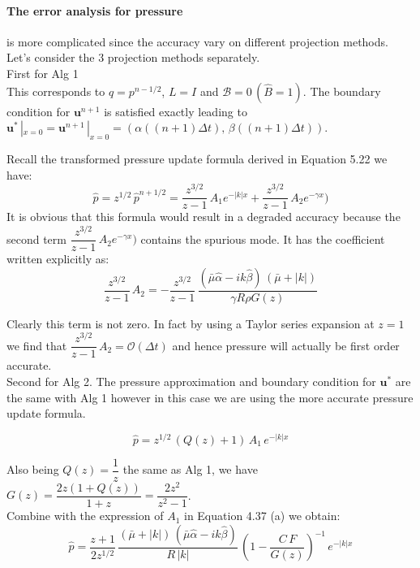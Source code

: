 \paragraph*{The error analysis for pressure} is more complicated since the accuracy vary on different projection methods.\\

Let's consider the 3 projection methods separately.\\
First for Alg 1\\
This corresponds to $q = p^{n-1/2}$, $L = I$ and $\mathcal{B} = 0 \, (\hat{B} = 1)$. The boundary condition for $\textbf{u}^{n+1}$ is satisfied exactly leading to $\textbf{u}^*\,|_{x=0} = \textbf{u}^{n+1}\,|_{x=0} = (\alpha((n+1)\Delta t),\,\beta((n+1)\Delta t))$.

Recall the transformed pressure update formula derived in Equation 5.22 we have:
\begin{equation}
\hat{p} = z^{1/2}\,\hat{p}^{n+1/2} = \dfrac{z^{3/2}}{z-1}\, A_1 e^{-|k|x} + \dfrac{z^{3/2}}{z-1}\, A_2 e^{-\gamma x})
\end{equation}
It is obvious that this formula would result in a degraded accuracy because the second term $\dfrac{z^{3/2}}{z-1}\, A_2 e^{-\gamma x})$ contains the spurious mode. It has the coefficient written explicitly as:
\begin{equation*}
\dfrac{z^{3/2}}{z-1}\, A_2  = -\dfrac{z^{3/2}}{z-1}\,\dfrac{(\bar{\mu} \hat{\alpha} - ik \hat{\beta})\,(\bar{\mu} + |k|)}{\gamma R \rho G(z)}
\end{equation*}

Clearly this term is not zero. In fact by using a Taylor series expansion at $z=1$ we find that $\dfrac{z^{3/2}}{z-1}\,A_2 = \mathcal{O} (\Delta t)$ and hence pressure will actually be first order accurate.\\

Second for Alg 2. The pressure approximation and boundary condition for $\textbf{u}^*$ are the same with Alg 1 however in this case we are using the more accurate pressure update formula. 

\begin{dmath}
\hat{p} = z^{1/2}\,(Q(z) + 1)\,A_1\,e^{-|k|x}
\end{dmath}

Also being $Q(z) = \dfrac{1}{z}$ the same as Alg 1, we have $G(z) = \dfrac{2z(1+Q(z))}{1+z} = \dfrac{2z^2}{z^2 - 1}$.\\

Combine with the expression of $A_1$ in Equation 4.37 (a) we obtain:\\
\begin{equation}
\hat{p} = \dfrac{z+1}{2z^{1/2}}\,\dfrac{(\bar{\mu} + |k|)\,(\bar{\mu} \hat{\alpha}  -ik \hat{\beta})}{R\,|k|}\,(1 - \dfrac{C\,F}{G(z)})^{-1}\,e^{-|k|x}
\end{equation}

